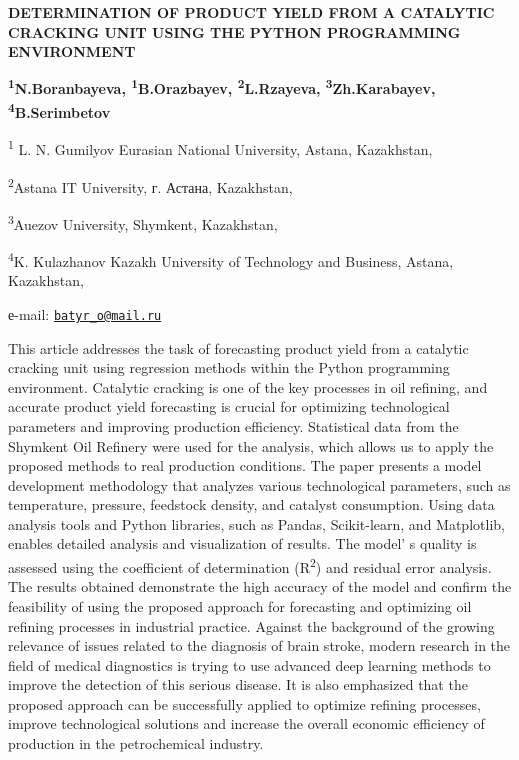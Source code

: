 {\bfseries DETERMINATION OF PRODUCT YIELD FROM A CATALYTIC CRACKING UNIT
USING THE PYTHON PROGRAMMING ENVIRONMENT}

{\bfseries \textsuperscript{1}N.Boranbayeva,
\textsuperscript{1}B.Orazbayev\textsuperscript{\envelope },
\textsuperscript{2}L.Rzayeva, \textsuperscript{3}Zh.Karabayev,
\textsuperscript{4}B.Serimbetov}

\textsuperscript{1} L. N. Gumilyov Eurasian National University, Astana,
Kazakhstan,

\textsuperscript{2}Astana IT University, г. Астана, Kazakhstan,

\textsuperscript{3}Auezov University, Shymkent, Kazakhstan,

\textsuperscript{4}K. Kulazhanov Kazakh University of Technology and
Business, Astana, Kazakhstan,

е-mail: \href{mailto:batyr_o@mail.ru}{\nolinkurl{batyr\_o@mail.ru}}

This article addresses the task of forecasting product yield from a
catalytic cracking unit using regression methods within the Python
programming environment. Catalytic cracking is one of the key processes
in oil refining, and accurate product yield forecasting is crucial for
optimizing technological parameters and improving production efficiency.
Statistical data from the Shymkent Oil Refinery were used for the
analysis, which allows us to apply the proposed methods to real
production conditions. The paper presents a model development
methodology that analyzes various technological parameters, such as
temperature, pressure, feedstock density, and catalyst consumption.
Using data analysis tools and Python libraries, such as Pandas,
Scikit-learn, and Matplotlib, enables detailed analysis and
visualization of results. The model' s quality is
assessed using the coefficient of determination (R\textsuperscript{2})
and residual error analysis. The results obtained demonstrate the high
accuracy of the model and confirm the feasibility of using the proposed
approach for forecasting and optimizing oil refining processes in
industrial practice. Against the background of the growing relevance of
issues related to the diagnosis of brain stroke, modern research in the
field of medical diagnostics is trying to use advanced deep learning
methods to improve the detection of this serious disease. It is also
emphasized that the proposed approach can be successfully applied to
optimize refining processes, improve technological solutions and
increase the overall economic efficiency of production in the
petrochemical industry.

